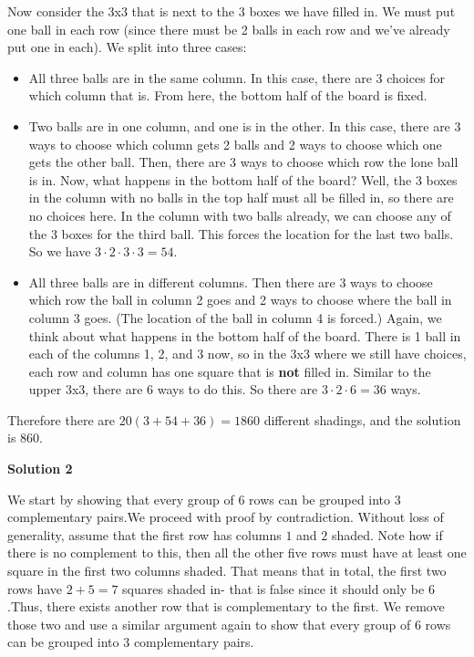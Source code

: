 \begin{enumerate}
 Now consider the 3x3 that is next to the 3 boxes we have filled in.  We must put one ball in each row (since there must be 2 balls in each row and we've already put one in each).  We split into three cases:

 
            \begin{itemize}
        \item All three balls are in the same column.  In this case, there are $3$ choices for which column that is.  From here, the bottom half of the board is fixed.
            \end{itemize}
            
            \begin{itemize}
        \item Two balls are in one column, and one is in the other.  In this case, there are 3 ways to choose which column gets 2 balls and 2 ways to choose which one gets the other ball.  Then, there are 3 ways to choose which row the lone ball is in.  Now, what happens in the bottom half of the board?  Well, the 3 boxes in the column with no balls in the top half must all be filled in, so there are no choices here.  In the column with two balls already, we can choose any of the 3 boxes for the third ball.  This forces the location for the last two balls.  So we have $3 \cdot 2 \cdot 3 \cdot 3 = 54$.
            \end{itemize}
            
            \begin{itemize}
        \item All three balls are in different columns.  Then there are 3 ways to choose which row the ball in column 2 goes and 2 ways to choose where the ball in column 3 goes.  (The location of the ball in column 4 is forced.)  Again, we think about what happens in the bottom half of the board.  There is 1 ball in each of the columns 1, 2, and 3 now, so in the 3x3 where we still have choices, each row and column has one square that is \textbf{not} filled in. Similar to the upper 3x3, there are 6 ways to do this.  So there are $3 \cdot 2 \cdot 6 = 36$ ways.
            \end{itemize}
            Therefore there are $20(3+54+36) = 1860$ different shadings, and the solution is $\boxed{860}$.

 



\textbf{Solution 2}

We start by showing that every group of $6$ rows can be grouped into $3$ complementary pairs.We proceed with proof by contradiction. Without loss of generality, assume that the first row has columns $1$ and $2$ shaded. Note how if there is no complement to this, then all the other five rows must have at least one square in the first two columns shaded. That means that in total, the first two rows have $2+5=7$ squares shaded in- that is false since it should only be $6$.Thus, there exists another row that is complementary to the first. We remove those two and use a similar argument again to show that every group of $6$ rows can be grouped into $3$ complementary pairs.


\end{enumerate}
